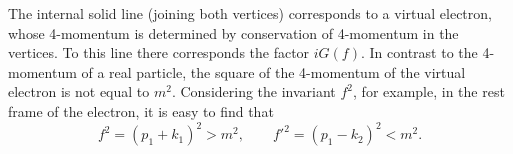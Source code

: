 The internal solid line (joining both vertices) corresponds to a virtual electron, whose 4-momentum is determined by conservation of 4-momentum in the vertices. To this line there corresponds the factor $iG(f)$. In contrast to the 4-momentum of a real particle, the square of the 4-momentum of the virtual electron is not equal to $m^2$. Considering the invariant $f^2$, for example, in the rest frame of the electron, it is easy to find that
\begin{equation}
f^2 = (p_1 + k_1)^2 > m^2,\qquad f'^2 = (p_1 - k_2)^2 < m^2.
\tag{74.15}
\end{equation}

